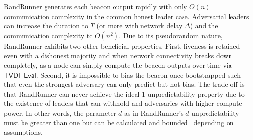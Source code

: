 RandRunner generates each beacon output rapidly with only $O(n)$ communication complexity in the common honest leader case. Adversarial leaders can increase the \epoch duration to $T$ (or more with network delay $\Delta$) and the communication complexity to $O(n^2)$. Due to its pseudorandom nature, RandRunner exhibits two other beneficial properties. First, liveness is retained even with a dishonest majority and when network connectivity breaks down completely, as a node can simply compute the beacon outputs over time via $\mathsf{TVDF.Eval}$. Second, it is impossible to bias the beacon once bootstrapped such that even the strongest adversary can only predict but not bias. The trade-off is that RandRunner can never achieve the ideal 1-unpredictability property due to the existence of leaders that can withhold and adversaries with higher compute power. In other words, the parameter $d$ as in RandRunner's $d$-unpredictability must be greater than one but can be calculated and bounded~\cite{schindler2021randrunner} depending on assumptions.
